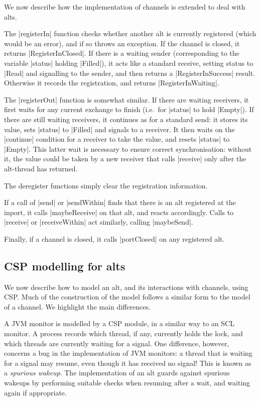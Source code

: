 We now describe how the implementation of channels is extended to deal with
alts.

The |registerIn| function checks whether another alt is currently registered
(which would be an error), and if so throws an exception.  If the channel is
closed, it returns |RegisterInClosed|.  If there is a waiting sender
(corresponding to the variable |status| holding |Filled|), it acts like a
standard receive, setting status to |Read| and signalling to the sender, and
then returns a |RegisterInSuccess| result.  Otherwise it records the
registration, and returns |RegisterInWaiting|.  

The |registerOut| function is somewhat similar.  If there are waiting
receivers, it first waits for any current exchange to finish (i.e.~for
|status| to hold |Empty|).  If there are still waiting receivers, it continues
as for a standard send: it stores its value, sets |status| to |Filled| and
signals to a receiver.  It then waits on the |continue| condition for a
receiver to take the value, and resets |status| to |Empty|.  This latter wait
is necessary to ensure correct synchronisation: without it, the value could be
taken by a new receiver that calls |receive| only after the alt-thread has
returned.  

The deregister functions simply clear the registration information.

If a call of |send| or |sendWithin| finds that there is an alt registered at
the inport, it calls |maybeReceive| on that alt, and reacts accordingly.
Calls to |receive| or |receiveWithin| act similarly, calling |maybeSend|.  

Finally, if a channel is closed, it calls |portClosed| on any registered alt. 


\subsection{CSP modelling for alts}

\inlineCSP

We now describe how to model an alt, and its interactions with channels, using
CSP\@.  Much of the construction of the model follows a similar form to the
model of a channel.  We highlight the main differences. 

A JVM monitor is modelled by a CSP module, in a similar way to an SCL monitor.
A process records which thread, if any, currently holds the lock, and which
threads are currently waiting for a signal.  One difference, however, concerns
a bug in the implementation of JVM monitors: a thread that is waiting for a
signal may resume, even though it has received no signal!  This is known as a
\emph{spurious wakeup}.  The implementation of an alt guards against spurious
wakeups by performing suitable checks when resuming after a wait, and waiting
again if appropriate.

